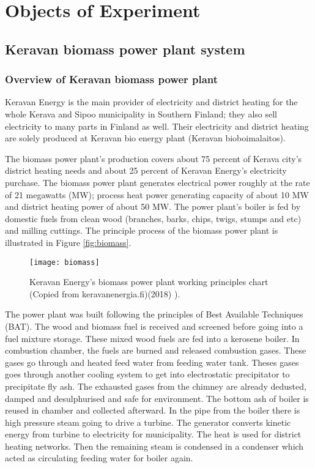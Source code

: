
\chapter{Objects of Experiment}

\section{Keravan biomass power plant system}
\subsection{Overview of Keravan biomass power plant}
Keravan Energy is the main provider of electricity and district heating for the whole Kerava and Sipoo municipality in Southern Finland; they also sell electricity to many parts in Finland as well. Their electricity and district heating are solely produced at Keravan bio energy plant (Keravan bioboimalaitos).\cite{kerava:web}

The biomass power plant's production covers about 75 percent of Kerava city's district heating needs and about 25 percent of Keravan Energy's electricity purchase. The biomass power plant generates electrical power roughly at the rate of 21 megawatts (MW); process heat power generating capacity of about 10 MW and district heating power of about 50 MW. The power plant's boiler is fed by domestic fuels from clean wood (branches, barks, chips, twigs, stumps and etc) and milling cuttings. The principle process of the biomass power plant is illustrated in Figure \vref{fig:biomass}.

\begin{figure}[h]
  \centering
  \texttt{[image: biomass]}
  \caption{ Keravan Energy's biomass power plant working principles chart (Copied from keravanenergia.fi)(2018) \cite{kerava:web}).}
  \label{fig:biomass}
\end{figure}

The power plant was built following the principles of Best Available Techniques (BAT). The wood and biomass fuel is received and screened before going into a fuel mixture storage. These mixed wood fuels are fed into a kerosene boiler. In combustion chamber, the fuels are burned and released combustion gases. These gases go through and heated feed water from feeding water tank. Theses gases goes through another cooling system to get into electrostatic precipitator to precipitate fly ash. The exhausted gases from the chimney are already dedusted, damped and desulphurised and safe for environment. The bottom ash of boiler is reused in chamber and collected afterward. In the pipe from the boiler there is high pressure steam going to drive a turbine. The generator converts kinetic energy from turbine to electricity for municipality. The heat is used for district heating networks. Then the remaining steam is condensed in a condenser which acted as circulating  feeding water for boiler again.
